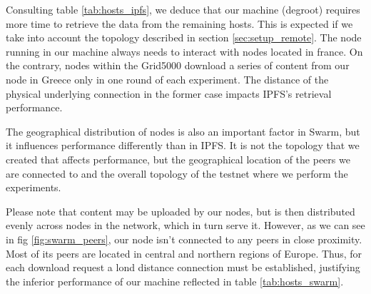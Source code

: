 Consulting table \ref{tab:hosts_ipfs}, we deduce that our machine (degroot) requires more time to retrieve the data from the remaining hosts. This is expected if we take into account the topology described in section \ref{sec:setup_remote}. The node running in our machine always needs to interact with nodes located in france. On the contrary, nodes within the Grid5000 download a series of content from our node in Greece only in one round of each experiment. The distance of the physical underlying connection in the former case impacts IPFS's retrieval performance.


The geographical distribution of nodes is also an important factor in Swarm, but it influences performance differently than in IPFS. It is not the topology that we created that affects performance, but the geographical location of the peers we are connected to and the overall topology of the testnet where we perform the experiments. 

Please note that content may be uploaded by our nodes, but is then distributed evenly across nodes in the network, which in turn serve it.
However, as we can see in fig \ref{fig:swarm_peers}, our node isn't connected to any peers in close proximity. Most of its peers are located in central and northern regions of Europe. Thus, for each download request a lond distance connection must be established, justifying the inferior performance of our machine reflected in table \ref{tab:hosts_swarm}.



